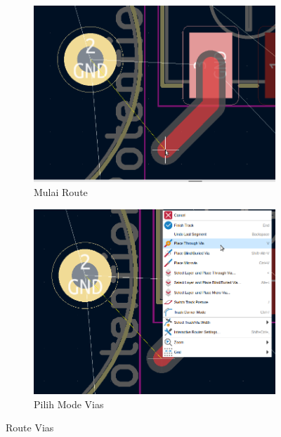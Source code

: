 \documentclass[12pt]{book}
\begin{document}
	\begin{figure}[!ht]
		\centering
		\begin{subfigure}[t]{0.45\textwidth}
			\includegraphics[width=\textwidth]{images/pcb/pcb_15}
			\caption{Mulai Route}
		\end{subfigure}
		\begin{subfigure}[t]{0.45\textwidth}
			\includegraphics[width=\textwidth]{images/pcb/pcb_16}
			\caption{Pilih Mode Vias}
		\end{subfigure}
		\caption{Route Vias}
	\end{figure}
\end{document}
